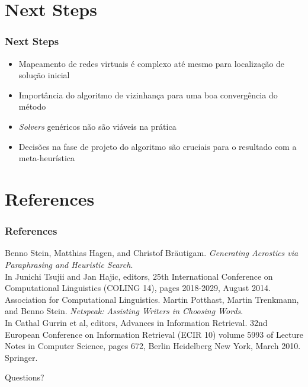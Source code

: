 \documentclass{beamer}
\begin{document}
\section{Next Steps}

\begin{frame}
\frametitle{Next Steps}
\begin{itemize}
\item Mapeamento de redes virtuais é complexo até mesmo para localização de solução inicial
\item Importância do algoritmo de vizinhança para uma boa convergência do método
\item \emph{Solvers} genéricos não são viáveis na prática
\item Decisões na fase de projeto do algoritmo são cruciais para o resultado com a meta-heurística
\end{itemize}
\end{frame}

\section{References}

\begin{frame}
\frametitle{References}
\footnotesize
\begin{thebibliography}{1}
	Benno Stein, Matthias Hagen, and Christof Bräutigam. \emph{Generating Acrostics via Paraphrasing and Heuristic Search}. \\
	In Junichi Tsujii and Jan Hajic, editors, 25th International Conference on Computational Linguistics (COLING 14), pages 2018-2029, August 2014. Association for Computational Linguistics. 
	Martin Potthast, Martin Trenkmann, and Benno Stein.
	\emph{Netspeak: Assisting Writers in Choosing Words}. \\
	In Cathal Gurrin et al, editors, Advances in Information Retrieval. 32nd European Conference on Information Retrieval (ECIR 10) volume 5993 of Lecture Notes in Computer Science, pages 672, Berlin Heidelberg New York, March 2010. Springer.
\end{thebibliography}
\end{frame}

\begin{frame}
\Huge{\centerline{Questions?}}
\end{frame}

\end{document}

